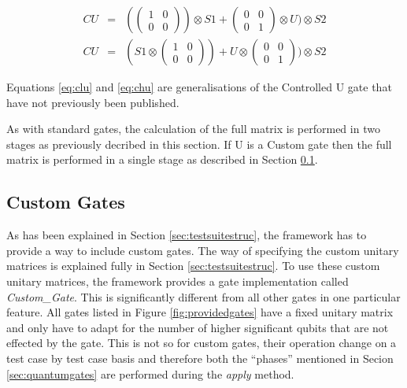 \begin{eqnarray}
\label{eq:clu}
 CU&=& (\begin{pmatrix}1&0\\0&0\end{pmatrix})\otimes S1 + \begin{pmatrix}0&0\\0&1\end{pmatrix}\otimes U) \otimes S2 \\
\label{eq:chu}
 CU&=& ( S1 \otimes \begin{pmatrix}1&0\\0&0\end{pmatrix}) +U \otimes \begin{pmatrix}0&0\\0&1\end{pmatrix}) \otimes S2
\end{eqnarray}

Equations \ref{eq:clu} and \ref{eq:chu} are generalisations of the Controlled U gate that have not previously been published.

As with standard gates, the calculation of the full matrix is performed in two stages as previously decribed in this section.
If U is a Custom gate then the full matrix is performed in a single stage as described in Section \ref{sec:custgates}.

\subsection{Custom Gates}
\label{sec:custgates}

As has been explained in Section \ref{sec:testsuitestruc}, the framework has to provide a way to include custom gates.
The way of specifying the custom unitary matrices is explained fully in Section \ref{sec:testsuitestruc}.
To use these custom unitary matrices, the framework provides a gate implementation called \emph{Custom\_Gate}.
This is significantly different from all other gates in one particular feature.
All gates listed in Figure \ref{fig:providedgates} have a fixed unitary matrix and only have to adapt for the number of higher significant qubits that are not effected by the gate.
This is not so for custom gates, their operation change on a test case by test case basis and therefore both the ``phases'' mentioned in Secion \ref{sec:quantumgates} are performed during the \emph{apply} method.

